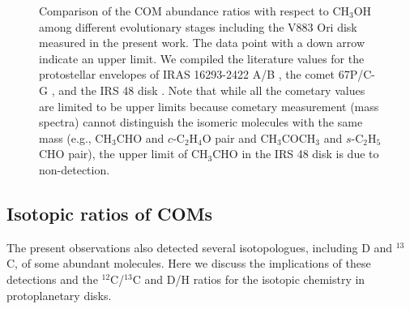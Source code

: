 \documentclass[twocolumn, twocolappendix, astrosymb, times]{aastex631}
\newcommand{\methanol}{CH$_3$OH\xspace}
\newcommand{\acetaldehyde}{CH$_3$CHO\xspace}
\newcommand{\methylformate}{CH$_3$OCHO\xspace}
\newcommand{\acetone}{CH$_3$COCH$_3$\xspace}
\newcommand{\ethyleneoxide}{$c$-C$_2$H$_4$O\xspace}
\newcommand{\propanal}{$s$-C$_2$H$_5$CHO\xspace}
\begin{document}
\begin{figure}
\caption{Comparison of the COM abundance ratios with respect to \methanol among different evolutionary stages including the V883 Ori disk measured in the present work. The data point with a down arrow indicate an upper limit. We compiled the literature values for the protostellar envelopes of IRAS 16293-2422 A/B \citep{Lykke2017, Jorgensen2018, Manigand2020, Manigand2021}, the comet 67P/C-G \citep{Rubin2019, Schuhmann2019}, and the IRS 48 disk \citep{Brunken2022}. Note that while all the cometary values are limited to be upper limits because cometary measurement (mass spectra) cannot distinguish the isomeric molecules with the same mass (e.g., \acetaldehyde and \ethyleneoxide pair and \acetone and \propanal pair), the upper limit of \acetaldehyde in the IRS 48 disk is due to non-detection.}
\label{fig:ratio_comparison}
\end{figure}



\subsection{Isotopic ratios of COMs}
The present observations also detected several isotopologues, including D and $^{13}$C, of some abundant molecules. Here we discuss the implications of these detections and the $^{12}$C/$^{13}$C and D/H ratios for the isotopic chemistry in protoplanetary disks. 
\end{document}
